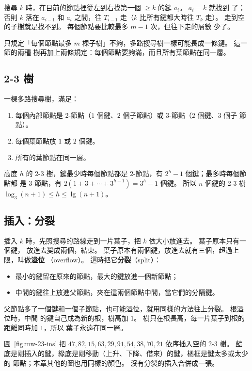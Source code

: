 搜尋 $k$ 時，在目前的節點裡從左到右找第一個 $\ge k$ 的鍵 $a_i$。 $a_i = k$ 就找到
了；否則 $k$ 落在 $a_{i-1}$ 和 $a_i$ 之間，往 $T_{i-1}$ 走（$k$ 比所有鍵都大時往
$T_k$ 走）。 走到空的子樹就是找不到。 每個節點要比較最多 $m - 1$ 次，但往下走的層數
少了。

只規定「每個節點最多 $m$ 棵子樹」不夠，多路搜尋樹一樣可能長成一條鏈。 這一節的兩種
樹再加上兩條規定：每個節點要夠滿，而且所有葉節點在同一層。

\subsection{2-3 樹}

\begin{definition}[2-3 樹]
\label{def:mw-23}
一棵多路搜尋樹，滿足：
\begin{enumerate}
\item 每個內部節點是 2-節點（$1$ 個鍵、$2$ 個子節點）或 3-節點（$2$ 個鍵、$3$ 個子
節點）。
\item 每個葉節點放 $1$ 或 $2$ 個鍵。
\item 所有的葉節點在同一層。
\end{enumerate}
\end{definition}

高度 $h$ 的 2-3 樹，鍵最少時每個節點都是 2-節點，有 $2^h - 1$ 個鍵；最多時每個節點都
是 3-節點，有 $2(1 + 3 + \cdots + 3^{h-1}) = 3^h - 1$ 個鍵。 所以 $n$ 個鍵的 2-3 樹
$\log_3(n + 1) \le h \le \lg(n + 1)$。

\subsection{插入：分裂}
\label{sec:mw-23-insert}

插入 $k$ 時，先照搜尋的路線走到一片葉子，把 $k$ 依大小放進去。 葉子原本只有一個鍵，
放進去變成兩個，結束。 葉子原本有兩個鍵，放進去就有三個，超過上限，叫做\textbf{溢位}
（overflow）。 這時把它\textbf{分裂}（split）：
\begin{itemize}
\item 最小的鍵留在原來的節點，最大的鍵放進一個新節點；
\item 中間的鍵往上放進父節點，夾在這兩個節點中間，當它們的分隔鍵。
\end{itemize}
父節點多了一個鍵和一個子節點，也可能溢位，就用同樣的方法往上分裂。 根溢位時，中間
的鍵自己成為新的根，樹高加 $1$。 樹只在根長高，每一片葉子到根的距離同時加 $1$，所以
葉子永遠在同一層。

圖~\ref{fig:mw-23-ins} 把 $47, 82, 15, 63, 29, 91, 54, 38, 70, 21$ 依序插入空的 2-3
樹。 藍底是剛插入的鍵，綠底是剛移動（上升、下降、借來）的鍵，橘框是鍵太多或太少的
節點；本章其他的圖也用同樣的顏色。 沒有分裂的插入合併成一張。

